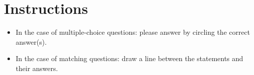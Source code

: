 \documentclass[11pt,a4paper,twoside]{article} %
\begin{document}
\maketitle
\thispagestyle{fancy}
\newpage

\section*{Instructions}
\begin{itemize}
    \item In the case of multiple-choice questions: please answer by 
          circling the correct answer(s). 
    \item In the case of matching questions: draw a line between the 
          statements and their answers. 
\end{itemize}
\end{document}
